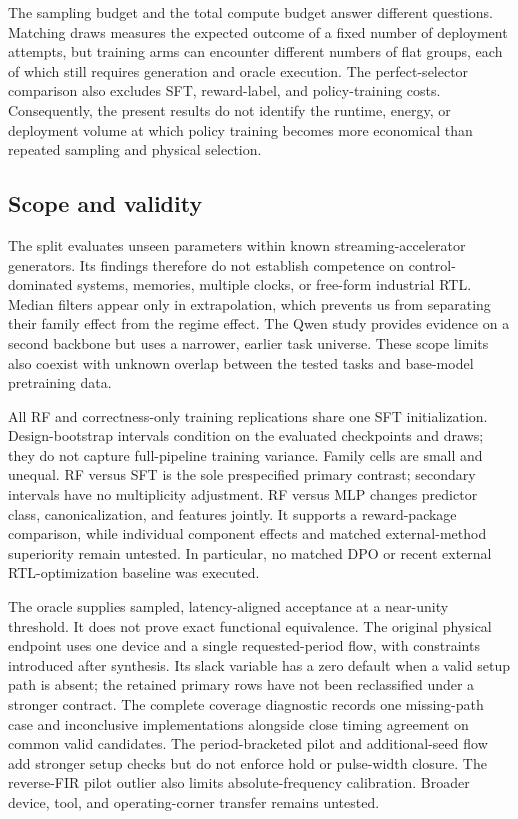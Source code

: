 The sampling budget and the total compute budget answer different questions.
Matching draws measures the expected outcome of a fixed number of deployment
attempts, but training arms can encounter different numbers of flat groups,
each of which still requires generation and oracle execution. The
perfect-selector comparison also excludes SFT, reward-label, and policy-training
costs. Consequently, the present results do not identify the runtime, energy,
or deployment volume at which policy training becomes more economical than
repeated sampling and physical selection.

\subsection{Scope and validity}

The split evaluates unseen parameters within known streaming-accelerator
generators. Its findings therefore do not establish competence on
control-dominated systems, memories, multiple clocks, or free-form industrial
RTL. Median filters appear only in extrapolation, which prevents us from
separating their family effect from the regime effect. The Qwen study provides
evidence on a second backbone but uses a narrower, earlier task universe.
These scope limits also coexist with unknown overlap between the tested tasks
and base-model pretraining data.

All RF and correctness-only training replications share one SFT initialization.
Design-bootstrap intervals condition on the evaluated checkpoints and draws;
they do not capture full-pipeline training variance. Family cells are small and
unequal. RF versus SFT is the sole prespecified primary contrast; secondary
intervals have no multiplicity adjustment. RF versus MLP changes predictor class,
canonicalization, and features jointly. It supports a reward-package comparison,
while individual component effects and matched external-method superiority
remain untested. In particular, no matched DPO or recent external RTL-optimization
baseline was executed.

The oracle supplies sampled, latency-aligned acceptance at a near-unity
threshold. It does not prove exact functional equivalence. The original physical
endpoint uses one device and a single requested-period flow, with constraints
introduced after synthesis. Its slack variable has a zero default when a valid
setup path is absent; the retained primary rows have not been reclassified under
a stronger contract. The complete coverage diagnostic records one missing-path
case and inconclusive implementations alongside close timing agreement on common
valid candidates. The period-bracketed pilot and additional-seed flow add
stronger setup checks but do not enforce hold or pulse-width closure. The
reverse-FIR pilot outlier also limits absolute-frequency calibration. Broader
device, tool, and operating-corner transfer remains untested.


